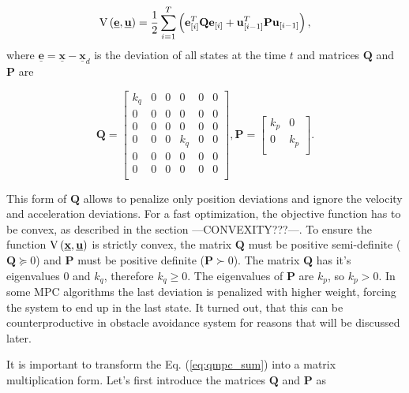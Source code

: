 \documentclass[a4paper,11pt,titlepage]{article}
\newcommand{\uvec}{\textbf{\underline{u}}}
\begin{document}
\begin{equation}
\label{eq:qmpc_sum}
\mathrm{V}\left(\textbf{\underline{e}}, \uvec\right) = \frac{1}{2}\sum_{i=1}^{T}\left(\textbf{e}^T_{[i]}\textbf{Q}\textbf{e}_{[i]} + \textbf{u}^T_{[i-1]}\textbf{P}\textbf{u}_{[i-1]}\right),
\end{equation}
where $\underline{\textbf{e}} = \underline{\textbf{x}} - \underline{\textbf{x}}_d$ is the deviation of all states at the time $t$  and matrices $\textbf{Q}$ and $\textbf{P}$ are

\begin{equation}
\label{eq:qmpc_weighting_matrices_simple}
\textbf{Q} = \begin{bmatrix}
k_q & 0 & 0 & 0 & 0 & 0 \\
0 & 0 & 0 & 0 & 0 & 0 \\
0 & 0 & 0 & 0 & 0 & 0 \\
0 & 0 & 0 & k_q & 0 & 0 \\
0 & 0 & 0 & 0 & 0 & 0 \\
0 & 0 & 0 & 0 & 0 & 0 \\
\end{bmatrix}, 
\textbf{P} = \begin{bmatrix}
k_p & 0\\
0 & k_p\\
\end{bmatrix}.
\end{equation}

This form of $\textbf{Q}$ allows to penalize only position deviations and ignore the velocity and acceleration deviations. For a fast optimization, the objective function has to be convex, as described in the section ---CONVEXITY???---. To ensure the function $\mathrm{V}\left(\textbf{\underline{x}}, \uvec\right)$ is strictly convex, the matrix $\textbf{Q}$ must be positive semi-definite ($\textbf{Q} \succeq 0$) and $\textbf{P}$ must be positive definite ($\textbf{P} \succ 0$). The matrix $\textbf{Q}$ has it's eigenvalues $0$ and $k_q$, therefore $k_q \geq 0$. The eigenvalues of $\textbf{P}$ are $k_p$, so $k_p > 0$. In some MPC algorithms the last deviation is penalized with higher weight, forcing the system to end up in the last state. It turned out, that this can be counterproductive in obstacle avoidance system for reasons that will be discussed later.

It is important to transform the Eq. (\ref{eq:qmpc_sum}) into a matrix multiplication form. Let's first introduce the matrices $\textbf{\^Q}$ and $\textbf{\^P}$ as 
\end{document}
